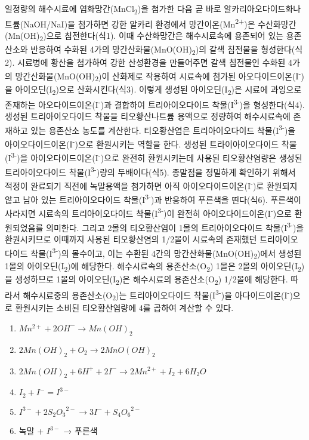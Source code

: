 \documentclass[
]{book}
\providecommand{\tightlist}{%
  \setlength{\itemsep}{0pt}\setlength{\parskip}{0pt}}
\begin{document}
일정량의 해수시료에 염화망간(MnCl\textsubscript{2})을 첨가한 다음 곧 바로 알카리아오다이드화나트륨(NaOH/NaI)을 첨가하면 강한 알카리 환경에서 망간이온(Mn\textsuperscript{2+})은 수산화망간(Mn(OH)\textsubscript{2})으로 침전한다(식1). 이때 수산화망간은 해수시료속에 용존되어 있는 용존산소와 반응하여 수화된 4가의 망간산화물(MnO(OH)\textsubscript{2})의 갈색 침전물을 형성한다(식2). 시료병에 황산을 첨가하여 강한 산성환경을 만들어주면 갈색 침전물인 수화된 4가의 망간산화물(MnO(OH)\textsubscript{2})이 산화제로 작용하여 시료속에 첨가된 아오다이드이온(I\textsuperscript{-})을 아이오딘(I\textsubscript{2})으로 산화시킨다(식3). 이렇게 생성된 아이오딘(I\textsubscript{2})은 시료에 과잉으로 존재하는 아오다이드이온(I\textsuperscript{-})과 결합하여 트리아이오다이드 착물(I\textsuperscript{3-})을 형성한다(식4). 생성된 트리아이오다이드 착물을 티오황산나트륨 용액으로 정량하여 해수시료속에 존재하고 있는 용존산소 농도를 계산한다. 티오황산염은 트리아이오다이드 착물(I\textsuperscript{3-})을 아이오다이드이온(I\textsuperscript{-})으로 환원시키는 역할을 한다. 생성된 트라이아이오다이드 착물(I\textsuperscript{3-})을 아이오다이드이온(I\textsuperscript{-})으로 완전히 환원시키는데 사용된 티오황산염량은 생성된 트리아이오다이드 착물(I\textsuperscript{3-})량의 두배이다(식5). 종말점을 정밀하게 확인하기 위해서 적정이 완료되기 직전에 녹말용액을 첨가하면 아직 아이오다이드이온(I\textsuperscript{-})로 환원되지 않고 남아 있는 트리아이오다이드 착물(I\textsuperscript{3-})과 반응하여 푸른색을 띤다(식6). 푸른색이 사라지면 시료속의 트리아이오다이드 착물(I\textsuperscript{3-})이 완전히 아이오다이드이온(I\textsuperscript{-})으로 환원되었음를 의미한다. 그리고 2몰의 티오황산염이 1몰의 트리아이오다이드 착물(I\textsuperscript{3-})을 환원시키므로 이때까지 사용된 티오황산염의 1/2몰이 시료속의 존재했던 트리아이오다이드 착물(I\textsuperscript{3-})의 몰수이고, 이는 수환된 4간의 망간산화물(MnO(OH)\textsubscript{2})에서 생성된 1몰의 아이오딘(I\textsubscript{2})에 해당한다. 해수시료속의 용존산소(O\textsubscript{2}) 1몰은 2몰의 아이오딘(I\textsubscript{2})을 생성하므로 1몰의 아이오딘(I\textsubscript{2})은 해수시료의 용존산소(O\textsubscript{2}) 1/2몰에 해당한다. 따라서 해수시료중의 용존산소(O\textsubscript{2})는 트리아이오다이드 착물(I\textsuperscript{3-})을 아다이드이온(I\textsuperscript{-})으로 환원시키는 소비된 티오황산염량에 4를 곱하여 계산할 수 있다.

\begin{enumerate}
\def\labelenumi{(\arabic{enumi})}
\tightlist
\item
  \(Mn^{2+} + 2OH^{-} → Mn(OH)_{2}\)\\
\item
  \(2Mn(OH)_{2} + O_{2} → 2MnO(OH)_{2}\)\\
\item
  \(2Mn(OH)_{2} + 6H^{+} + 2I^{-} → 2Mn^{2+} + I_{2} + 6H_{2}O\)\\
\item
  \(I_{2} +I^{-} = I^{3-}\)\\
\item
  \(I^{3-} +{2S_{2}O_{3}}^{2-} → 3I^{-} +{S_{4}O_{6}}^{2-}\)\\
\item
  녹말 + \(I^{3-}\) → 푸른색
\end{enumerate}
\end{document}
